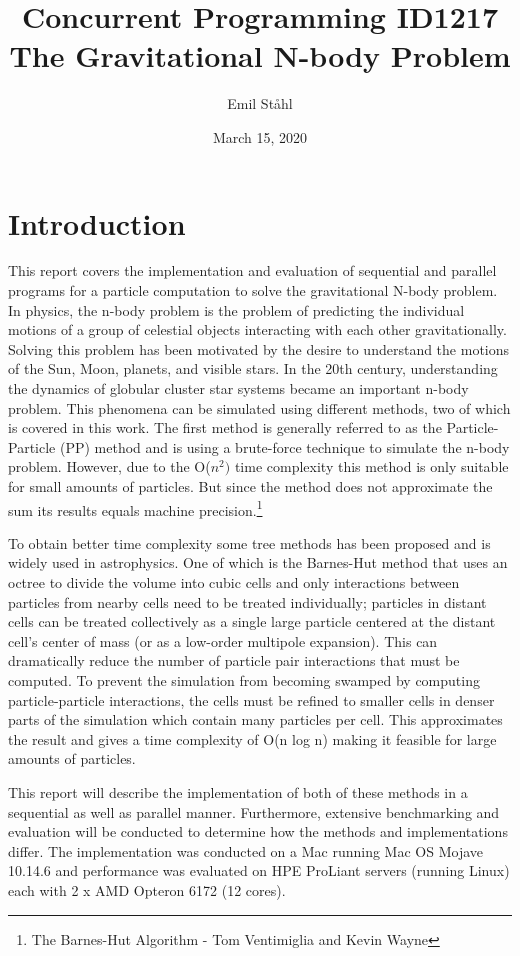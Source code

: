 \documentclass{article}
\title{\textbf{Concurrent Programming ID1217} \\ 
\textbf{The Gravitational N-body Problem}}
\author{Emil Ståhl}
\date{March 15, 2020}
\begin{document}
\maketitle

\section{Introduction}

This report covers the implementation and evaluation of sequential and parallel programs for a particle computation to solve the gravitational N-body problem. In physics, the n-body problem is the problem of predicting the individual motions of a group of celestial objects interacting with each other gravitationally. Solving this problem has been motivated by the desire to understand the motions of the Sun, Moon, planets, and visible stars. In the 20th century, understanding the dynamics of globular cluster star systems became an important n-body problem. This phenomena can be simulated using different methods, two of which is covered in this work. The first method is generally referred to as the Particle-Particle (PP) method and is using a brute-force technique to simulate the n-body problem. However, due to the O(\(n^2)\) time complexity this method is only suitable for small amounts of particles. But since the method does not approximate the sum its results equals machine precision.\footnote{The Barnes-Hut Algorithm - Tom Ventimiglia and Kevin Wayne} 

To obtain better time complexity some tree methods has been proposed and is widely used in astrophysics. One of which is the Barnes-Hut method that uses an octree to divide the volume into cubic cells and only interactions between particles from nearby cells need to be treated individually; particles in distant cells can be treated collectively as a single large particle centered at the distant cell's center of mass (or as a low-order multipole expansion). This can dramatically reduce the number of particle pair interactions that must be computed. To prevent the simulation from becoming swamped by computing particle-particle interactions, the cells must be refined to smaller cells in denser parts of the simulation which contain many particles per cell. This approximates the result and gives a time complexity of O(n log n) making it feasible for large amounts of particles. 

This report will describe the implementation of both of these methods in a sequential as well as parallel manner. Furthermore, extensive benchmarking and evaluation will be conducted to determine how the methods and implementations differ. The implementation was conducted on a Mac running Mac OS Mojave 10.14.6 and performance was evaluated on HPE ProLiant servers (running Linux) each with 2 x AMD Opteron 6172 (12 cores).
\end{document}
